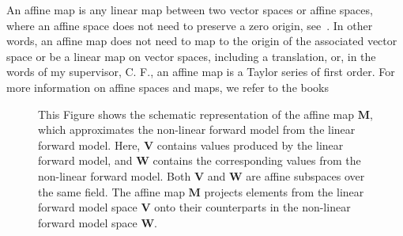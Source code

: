 An affine map is any linear map between two vector spaces or affine spaces, where an affine space does not need to preserve a zero origin, see~\cite[Def. 2.3.1]{berger2009geometry}.
In other words, an affine map does not need to map to the origin of the associated vector space or be a linear map on vector spaces, including a translation, or, in the words of my supervisor, C. F., an affine map is a Taylor series of first order.
For more information on affine spaces and maps, we refer to the books \cite{berger2009geometry, katsumi1994affine}
\begin{figure}[ht!]
	\centering
	\caption[Schematics of the affine map]{This Figure shows the schematic representation of the affine map $\bm{M}$, which approximates the non-linear forward model from the linear forward model. Here, $\bm{V}$ contains values produced by the linear forward model, and $\bm{W}$ contains the corresponding values from the non-linear forward model. Both $\bm{V}$ and $\bm{W}$ are affine subspaces over the same field. The affine map $\bm{M}$ projects elements from the linear forward model space $\bm{V}$ onto their counterparts in the non-linear forward model space $\bm{W}$.
	}
\end{figure}
\newcommand*{\vertbar}{\rule[-1ex]{0.5pt}{2.5ex}}
\newcommand*{\horzbar}{\rule[.5ex]{2.5ex}{0.5pt}}
